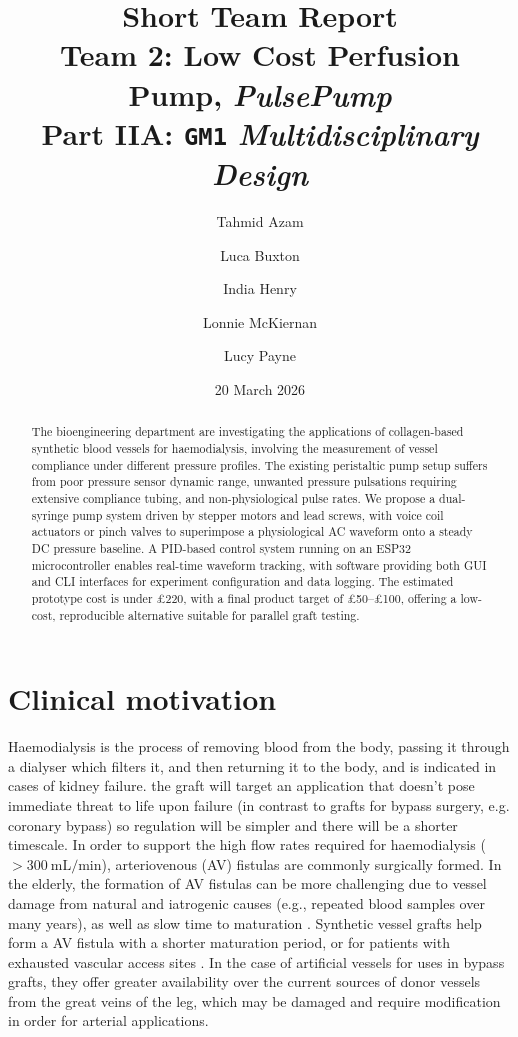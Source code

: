 \documentclass[10pt, a4paper]{article}
\title{
    Short Team Report\\[0.5em] 
    \Large Team 2: Low Cost Perfusion Pump, \textit{PulsePump}\\[0.25em]  
    \normalsize Part IIA: \texttt{GM1} \textit{Multidisciplinary Design}
}
\author[1]{Tahmid Azam}
\author[1]{Luca Buxton}
\author[1]{India Henry}
\author[1]{Lonnie McKiernan}
\author[1]{Lucy Payne}
\affil[ ]{{\normalsize Mentored by Dr. Peter Long and Prof. Athina E. Markaki}}
\affil[ ]{{\small}}
\affil[1]{Department of Engineering, University of Cambridge}
\date{20 March 2026}
\begin{document}
\maketitle

\pagestyle{fancy}
\fancyhf{}
\fancyfoot[C]{\thepage}
\thispagestyle{plain}

\begin{abstract}
    The bioengineering department are investigating the applications of collagen-based synthetic blood vessels for haemodialysis, involving the measurement of vessel compliance under different pressure profiles.
    The existing peristaltic pump setup suffers from poor pressure sensor dynamic range, unwanted pressure pulsations requiring extensive compliance tubing, and non-physiological pulse rates.
    We propose a dual-syringe pump system driven by stepper motors and lead screws, with voice coil actuators or pinch valves to superimpose a physiological AC waveform onto a steady DC pressure baseline.
    A PID-based control system running on an ESP32 microcontroller enables real-time waveform tracking, with software providing both GUI and CLI interfaces for experiment configuration and data logging.
    The estimated prototype cost is under £220, with a final product target of £50--£100, offering a low-cost, reproducible alternative suitable for parallel graft testing.
\end{abstract}

\newpage

\section{Clinical motivation}

Haemodialysis is the process of removing blood from the body, passing it through a dialyser which filters it, and then returning it to the body, and is indicated in cases of kidney failure.
the graft will target an application that doesn't pose immediate threat to life upon failure (in contrast to grafts for bypass surgery, e.g. coronary bypass) so regulation will be simpler and there will be a shorter timescale.
In order to support the high flow rates required for haemodialysis ($>\SI{300}{\milli\liter\per\minute}$), arteriovenous (AV) fistulas are commonly surgically formed.
In the elderly, the formation of AV fistulas can be more challenging due to vessel damage from natural and iatrogenic causes (e.g., repeated blood samples over many years), as well as slow time to maturation \supercite{mcgroganArteriovenousFistulaOutcomes2015}.
Synthetic vessel grafts help form a AV fistula with a shorter maturation period, or for patients with exhausted vascular access sites \supercite{akohProstheticArteriovenousGrafts2009}.
In the case of artificial vessels for uses in bypass grafts, they offer greater availability over the current sources of donor vessels from the great veins of the leg, which may be damaged and require modification in order for arterial applications.
\end{document}
